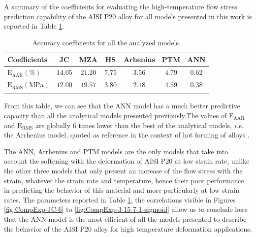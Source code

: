 \documentclass[twoside,english,1p,final,sort&compress]{elsarticle}
\makeatletter
\theoremstyle{plain}
\newcommand*{\ie}{\emph{i.e.}\@\xspace}
\newcommand{\RMSE}{\text{E}_\text{RMS}}
\newcommand{\AARE}{\text{E}_\text{AAR}}
\makeatother
\begin{document}
A summary of the coefficients for evaluating the high-temperature flow stress prediction capability of the AISI P20 alloy for all models presented in this work is reported in Table \ref{tab:Errors}.
\begin{table}[h!]
\centering
\caption{Accuracy coefficients for all the analyzed models.}
\begin{tabular}{lcccccc}
\hline
Coefficients & JC & MZA & HS & Arhenius & PTM & ANN\\
\hline
$\AARE(\%)$ & $14.05$ & $21.20$ & $7.75$ & $3.56$ & $4.79$ & $0.62$\\
$\RMSE(\text{MPa})$ & $12.00$ & $19.57$ & $3.80$ & $2.18$ & $4.59$ & $0.38$\\
\hline
\label{tab:Errors}
\end{tabular}
\end{table}
From this table, we can see that the ANN model has a much better predictive capacity than all the analytical models presented previously.The values of $\AARE$ and $\RMSE$ are globally $6$ times lower than the best of the analytical models, \ie the Arrhenius model, quoted as reference in the context of hot forming of alloys \cite{Liang-2022}.

The ANN, Arrhenius and PTM models are the only models that take into account the softening with the deformation of AISI P20 at low strain rate, unlike the other three models that only present an increase of the flow stress with the strain, whatever the strain rate and temperature, hence their poor performance in predicting the behavior of this material and more particularly at low strain rates.
The parameters reported in Table \ref{tab:Errors}, the correlations visible in Figures \ref{fig:CompExp-JC-6} to \ref{fig:CompExp-3-15-7-1-sigmoid} allow us to conclude here that the ANN model is the most efficient of all the models presented to describe the behavior of the AISI P20 alloy for high temperature deformation applications.

\end{document}
